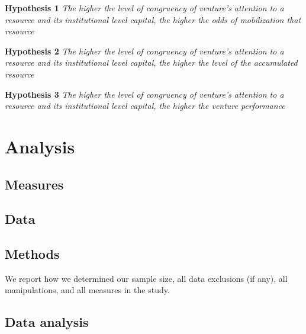 \documentclass[
  english,
  man]{apa6}
\begin{document}
\textbf{Hypothesis 1} \emph{The higher the level of congruency of venture's attention to a resource and its institutional level capital, the higher the odds of mobilization that resource}

\textbf{Hypothesis 2} \emph{The higher the level of congruency of venture's attention to a resource and its institutional level capital, the higher the level of the accumulated resource}

\textbf{Hypothesis 3} \emph{The higher the level of congruency of venture's attention to a resource and its institutional level capital, the higher the venture performance}

\hypertarget{analysis}{%
\section{Analysis}\label{analysis}}

\hypertarget{measures}{%
\subsection{Measures}\label{measures}}

\hypertarget{data}{%
\subsection{Data}\label{data}}

\hypertarget{methods}{%
\subsection{Methods}\label{methods}}

We report how we determined our sample size, all data exclusions (if any), all manipulations, and all measures in the study.

\hypertarget{data-analysis}{%
\subsection{Data analysis}\label{data-analysis}}
\end{document}
